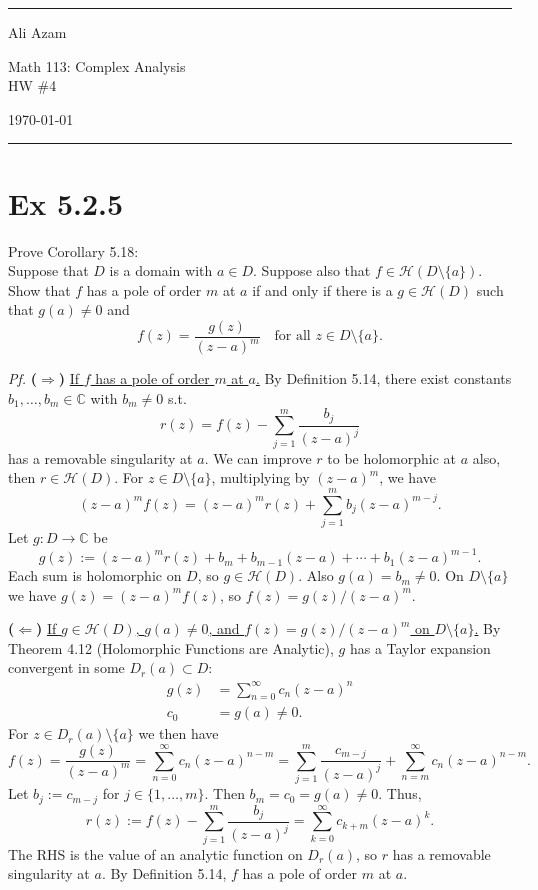 \documentclass[a4paper]{article}
\newcommand{\C}{\mathbb{C}}
\newcommand{\Hol}{\mathcal{H}}
\begin{document}
\hrule\medskip
\begin{minipage}{0.295\textwidth}\raggedright\footnotesize
Ali Azam
\end{minipage}%
\begin{minipage}{0.4\textwidth}\centering
\large Math 113: Complex Analysis\\
\normalsize HW \#4
\end{minipage}%
\begin{minipage}{0.295\textwidth}\raggedleft
\today
\end{minipage}
\medskip\hrule\bigskip

\section*{Ex 5.2.5}

\begin{tcolorbox}[colback=gray!10, colframe=black, boxrule=0.5pt, arc=2mm]
Prove Corollary 5.18:\\[3pt]
Suppose that $D$ is a domain with $a \in D$. Suppose also that $f \in \Hol(D \setminus \{a\})$.
Show that $f$ has a pole of order $m$ at $a$ if and only if there is a
$g \in \Hol(D)$ such that $g(a) \neq 0$ and
\[
f(z) = \frac{g(z)}{(z-a)^m} \quad \text{for all } z \in D \setminus \{a\}.
\]
\end{tcolorbox}

\textit{Pf.} \textbf{($\Rightarrow$)} \underline{If $f$ has a pole of order $m$ at $a$.} By Definition 5.14,
there exist constants $b_1, \dots, b_m \in \C$ with $b_m \neq 0$ s.t.
\[
r(z) = f(z) - \sum_{j=1}^{m} \frac{b_j}{(z-a)^j}
\]
has a removable singularity at $a$. We can improve $r$ to be holomorphic at $a$ also, then
$r \in \Hol(D)$. For $z \in D \setminus \{a\}$, multiplying by $(z-a)^m$, we have
\[
(z-a)^m f(z) = (z-a)^m r(z) + \sum_{j=1}^{m} b_j (z-a)^{m-j}.
\]
Let $g : D \to \C$ be
\[
g(z) := (z-a)^m r(z) + b_m + b_{m-1}(z-a) + \cdots + b_1 (z-a)^{m-1}.
\]
Each sum is holomorphic on $D$, so $g \in \Hol(D)$. Also $g(a) = b_m \neq 0$.
On $D \setminus \{a\}$ we have $g(z) = (z-a)^m f(z)$, so $f(z) = g(z)/(z-a)^m$.

\medskip
\textbf{($\Leftarrow$)} \underline{If $g \in \Hol(D)$, $g(a) \neq 0$, and $f(z) = g(z)/(z-a)^m$
on $D \setminus \{a\}$.} By Theorem 4.12 (Holomorphic Functions are Analytic), $g$ has a
Taylor expansion convergent in some $D_r(a) \subset D$:
\begin{align*}
g(z) &= \sum_{n=0}^{\infty} c_n (z-a)^n\\
c_0 &= g(a) \neq 0.
\end{align*}
For $z \in D_r(a) \setminus \{a\}$ we then have
\[
f(z) = \frac{g(z)}{(z-a)^m}
     = \sum_{n=0}^{\infty} c_n (z-a)^{n-m}
     = \sum_{j=1}^{m} \frac{c_{m-j}}{(z-a)^j} + \sum_{n=m}^{\infty} c_n (z-a)^{n-m}.
\]
Let $b_j := c_{m-j}$ for $j \in \{1, \dots, m\}$. Then $b_m = c_0 = g(a) \neq 0$. Thus,
\[
r(z) := f(z) - \sum_{j=1}^{m} \frac{b_j}{(z-a)^j} = \sum_{k=0}^{\infty} c_{k+m}(z-a)^k.
\]
The RHS is the value of an analytic function on $D_r(a)$, so $r$ has a
removable singularity at $a$. By Definition 5.14, $f$ has a pole of order $m$ at $a$. 
\end{document}
